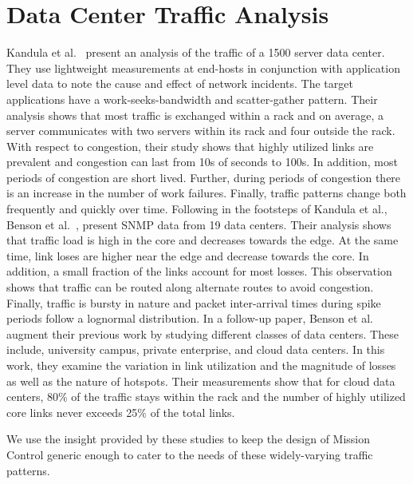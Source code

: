 \documentclass[a4paper,12pt,twoside,openright]{report}
\begin{document}
\section{Data Center Traffic Analysis}
Kandula et al.~\cite{Kandula:2009:NDC} present an analysis of the traffic of a
1500 server data center. They use lightweight measurements at end-hosts in
conjunction with application level data to note the cause and effect of network
incidents. The target applications have a work-seeks-bandwidth and
scatter-gather pattern. Their analysis shows that most traffic is exchanged
within a rack and on average, a server communicates with two servers within its
rack and four outside the rack. With respect to congestion, their study shows
that highly utilized links are prevalent and congestion can last from 10s of
seconds to 100s. In addition, most periods of congestion are short lived.
Further, during periods of congestion there is an increase in the number of work
failures. Finally, traffic patterns change both frequently and quickly over
time. Following in the footsteps of Kandula et al., Benson et
al.~\cite{Benson:2009:UDC}, present SNMP data from 19 data centers. Their
analysis shows that traffic load is high in the core and decreases towards the
edge. At the same time, link loses are higher near the edge and decrease towards
the core. In addition, a small fraction of the links account for most losses.
This observation shows that traffic can be routed along alternate routes to
avoid congestion. Finally, traffic is bursty in nature and packet inter-arrival
times during spike periods follow a lognormal distribution. In a follow-up
paper, Benson et al.~\cite{Benson:2010:NTC} augment their previous work by
studying different classes of data centers. These include, university campus,
private enterprise, and cloud data centers. In this work, they examine the
variation in link utilization and the magnitude of losses as well as the nature
of hotspots. Their measurements show that for cloud data centers, 80\% of the
traffic stays within the rack and the number of highly utilized core links never
exceeds 25\% of the total links.

We use the insight provided by these studies to keep the design of Mission
Control generic enough to cater to the needs of these widely-varying traffic
patterns.
\end{document}
